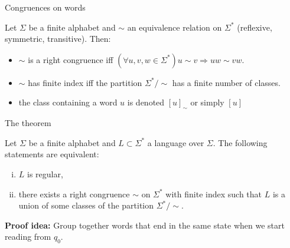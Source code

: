 \documentclass[handout]{beamer}
\begin{document}
\begin{frame}{Congruences on words}

    Let $\Sigma$ be a finite alphabet and $\sim$ an equivalence relation on $\Sigma^*$ (reflexive, symmetric, transitive). Then:
    
    \begin{itemize}
        \item $\sim$ is a \alert{right congruence} iff $(\forall u,v,w\in \Sigma^*) u\sim v \Rightarrow uw\sim vw $.
        \item $\sim$ has \alert{finite index} iff the partition $\Sigma^*/\sim$ has a finite number of classes.
        \item the class containing a word $u$ is denoted \alert{$[u]_{\sim}$} or simply $[u]$
    \end{itemize}

\end{frame}


\begin{frame}{The theorem}

    \begin{theorem}
        Let $\Sigma$ be a finite alphabet and $L \subset \Sigma^*$ a language over $\Sigma$. The following statements are
        equivalent:
            \begin{enumerate}[(i)]
                \item $L$ is regular,
                \item there exists a right congruence $\sim$ on $\Sigma^*$ with finite index such that $L$ is a union of some classes of the partition $\Sigma^*/\sim$.
            \end{enumerate}
    \end{theorem}

    \textbf{Proof idea:} Group together words that end in the same state when we start reading from $q_0$.

\end{frame}
\end{document}
